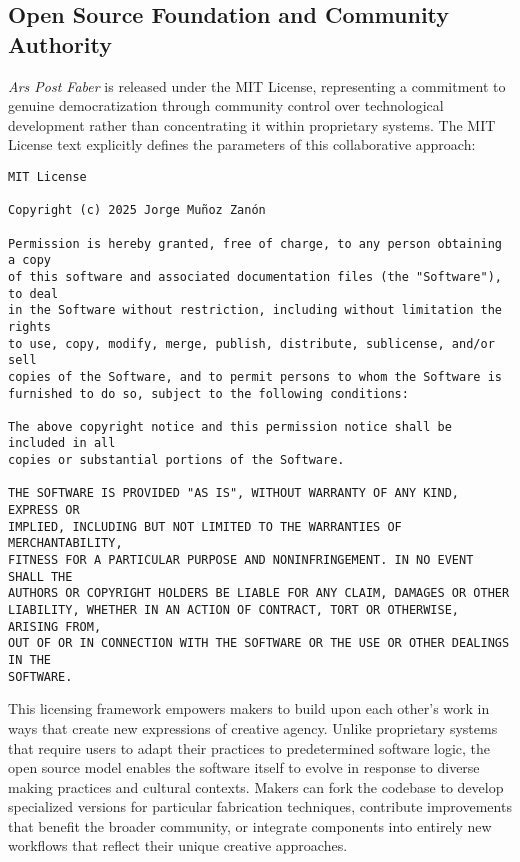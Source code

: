 \subsection{Open Source Foundation and Community Authority}

\textit{Ars Post Faber} is released under the MIT License, representing a commitment to genuine democratization through community control over technological development rather than concentrating it within proprietary systems. The MIT License text explicitly defines the parameters of this collaborative approach:

\vspace{0.5cm}

\begin{verbatim}
MIT License

Copyright (c) 2025 Jorge Muñoz Zanón

Permission is hereby granted, free of charge, to any person obtaining a copy
of this software and associated documentation files (the "Software"), to deal
in the Software without restriction, including without limitation the rights
to use, copy, modify, merge, publish, distribute, sublicense, and/or sell
copies of the Software, and to permit persons to whom the Software is
furnished to do so, subject to the following conditions:

The above copyright notice and this permission notice shall be included in all
copies or substantial portions of the Software.

THE SOFTWARE IS PROVIDED "AS IS", WITHOUT WARRANTY OF ANY KIND, EXPRESS OR
IMPLIED, INCLUDING BUT NOT LIMITED TO THE WARRANTIES OF MERCHANTABILITY,
FITNESS FOR A PARTICULAR PURPOSE AND NONINFRINGEMENT. IN NO EVENT SHALL THE
AUTHORS OR COPYRIGHT HOLDERS BE LIABLE FOR ANY CLAIM, DAMAGES OR OTHER
LIABILITY, WHETHER IN AN ACTION OF CONTRACT, TORT OR OTHERWISE, ARISING FROM,
OUT OF OR IN CONNECTION WITH THE SOFTWARE OR THE USE OR OTHER DEALINGS IN THE
SOFTWARE.
\end{verbatim}

\vspace{0.5cm}

This licensing framework empowers makers to build upon each other's work in ways that create new expressions of creative agency. Unlike proprietary systems that require users to adapt their practices to predetermined software logic, the open source model enables the software itself to evolve in response to diverse making practices and cultural contexts. Makers can fork the codebase to develop specialized versions for particular fabrication techniques, contribute improvements that benefit the broader community, or integrate components into entirely new workflows that reflect their unique creative approaches.

